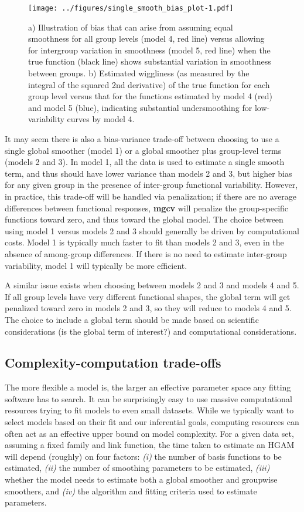 \documentclass[12pt]{article}
\begin{document}
\begin{figure}
\centering
\texttt{[image: ../figures/single\_smooth\_bias\_plot-1.pdf]}
\caption{\label{fig:var_pen} a) Illustration of bias that can arise from
assuming equal smoothness for all group levels (model 4, red line)
versus allowing for intergroup variation in smoothness (model 5, red
line) when the true function (black line) shows substantial variation in
smoothness between groups. b) Estimated wiggliness (as measured by the
integral of the squared 2nd derivative) of the true function for each
group level versus that for the functions estimated by model 4 (red) and
model 5 (blue), indicating substantial undersmoothing for
low-variability curves by model 4.}
\end{figure}

It may seem there is also a bias-variance trade-off between choosing to
use a single global smoother (model 1) or a global smoother plus
group-level terms (models 2 and 3). In model 1, all the data is used to
estimate a single smooth term, and thus should have lower variance than
models 2 and 3, but higher bias for any given group in the presence of
inter-group functional variability. However, in practice, this trade-off
will be handled via penalization; if there are no average differences
between functional responses, \textbf{mgcv} will penalize the
group-specific functions toward zero, and thus toward the global model.
The choice between using model 1 versus models 2 and 3 should generally
be driven by computational costs. Model 1 is typically much faster to
fit than models 2 and 3, even in the absence of among-group differences.
If there is no need to estimate inter-group variability, model 1 will
typically be more efficient.

A similar issue exists when choosing between models 2 and 3 and models 4
and 5. If all group levels have very different functional shapes, the
global term will get penalized toward zero in models 2 and 3, so they
will reduce to models 4 and 5. The choice to include a global term
should be made based on scientific considerations (is the global term of
interest?) and computational considerations.

\subsection{Complexity-computation
trade-offs}\label{complexity-computation-trade-offs}

The more flexible a model is, the larger an effective parameter space
any fitting software has to search. It can be surprisingly easy to use
massive computational resources trying to fit models to even small
datasets. While we typically want to select models based on their fit
and our inferential goals, computing resources can often act as an
effective upper bound on model complexity. For a given data set,
assuming a fixed family and link function, the time taken to estimate an
HGAM will depend (roughly) on four factors: \emph{(i)} the number of
basis functions to be estimated, \emph{(ii)} the number of smoothing
parameters to be estimated, \emph{(iii)} whether the model needs to
estimate both a global smoother and groupwise smoothers, and \emph{(iv)}
the algorithm and fitting criteria used to estimate parameters.
\end{document}
